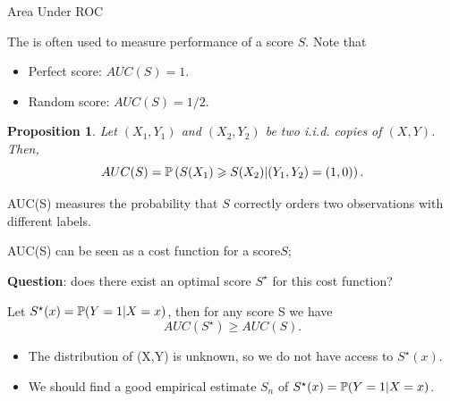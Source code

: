 \documentclass[xcolor={usenames,dvipsnames},handout]{beamer}
\newtheorem{prop}[theorem]{Proposition}
\begin{document}
\begin{frame}[allowframebreaks,fragile=singleslide]{Area Under ROC} 

The  is often used to measure performance of a score $S$.
Note that
\begin{itemize}
\item Perfect score: $AUC(S) = 1$. 
\item Random score: $AUC(S) = 1/2$.
\end{itemize}

\begin{prop} 
Let $(X_1,Y_1)$ and $(X_2,Y_2)$ be two i.i.d. copies of $(X,Y)$. Then,
$$
AUC(S) = \P \left( S(X_1) \geq S(X_2) | (Y_1,Y_2)=(1,0) \right).
$$
\end{prop}

 AUC(S) measures the \alert{probability that $S$ correctly orders two observations with different labels}.


%


AUC(S) can be seen as a cost function for a score$S$;




\framebreak

\textbf{Question}: does there exist an \alert{optimal score $S^\star$ for this cost function}?


\begin{theorem}
Let $S^\star(x)= \P(Y =1|X =x)$, then for any score S we have 
$$
AUC(S^\star)\geq AUC(S).
$$
\end{theorem}


\begin{itemize}
\item The distribution of (X,Y) is unknown, \alert{so we do not  have access to $S^\star(x)$}.

\vspace{.2cm}

\item We should find a \alert{good empirical  estimate $S_n$ of $S^\star(x)= \P(Y =1|X =x)$}.
\end{itemize}

\end{frame}
\end{document}
